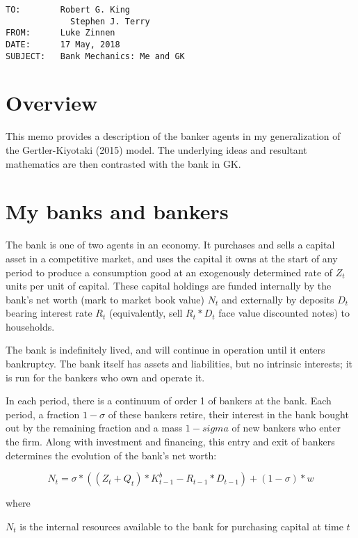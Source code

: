 \documentclass[english]{article}
\begin{document}
\begin{verbatim}
TO:        Robert G. King
             Stephen J. Terry
FROM:      Luke Zinnen
DATE:      17 May, 2018
SUBJECT:   Bank Mechanics: Me and GK
\end{verbatim}

\section{Overview}

This memo provides a description of the banker agents in my generalization of the Gertler-Kiyotaki (2015)
model. The underlying ideas and resultant mathematics are then contrasted with the bank in GK.

\section{My banks and bankers}
The bank is one of two agents in an economy. It purchases and sells a capital asset in a competitive 
market, and uses the capital it owns at the start of any period to produce a consumption good at 
an exogenously determined rate of $Z_t$ units per unit of capital. These capital holdings are funded internally 
by the bank's net worth (mark to market book value) $N_t$ and externally by deposits $D_t$ bearing interest rate 
$R_t$ (equivalently, sell $R_t*D_t$ face value discounted notes) to households.

The bank is indefinitely lived, and will continue in operation until it enters bankruptcy. The bank 
itself has assets and liabilities, but no intrinsic interests; it is run for the bankers who own and 
operate it.

In each period, there is a continuum of order 1 of bankers at the bank. Each period, a fraction 
$1-\sigma$ of these bankers retire, their interest in the bank bought out by the remaining fraction 
and a mass $1-sigma$ of new bankers who enter the firm. Along with investment and financing, this 
entry and exit of bankers determines the evolution of the bank's net worth:

\begin{equation}N_{t} = \sigma*\left(\left(Z_t + Q_t\right)*K^b_{t-1} - R_{t-1}*D_{t-1}\right) + \left(1 - \sigma\right)*w\end{equation}

where 

$N_t$ is the internal resources available to the bank for purchasing capital at time $t$
\end{document}
